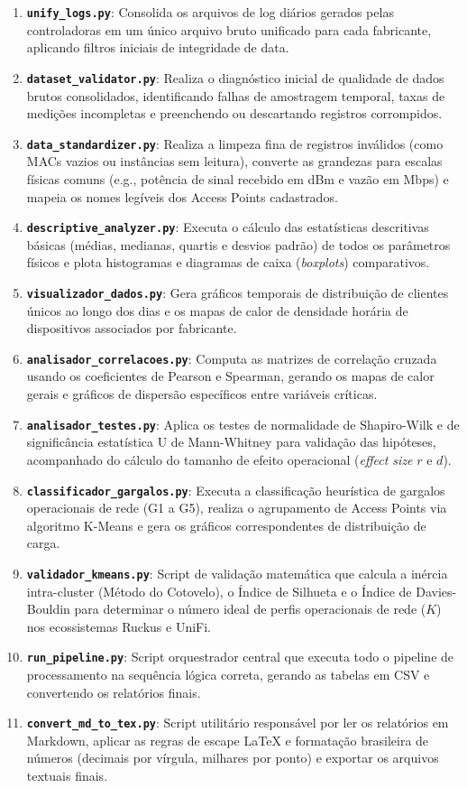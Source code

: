 \begin{enumerate}
    \item \textbf{\texttt{unify\_logs.py}}: Consolida os arquivos de log diários gerados pelas controladoras em um único arquivo bruto unificado para cada fabricante, aplicando filtros iniciais de integridade de data.
    \item \textbf{\texttt{dataset\_validator.py}}: Realiza o diagnóstico inicial de qualidade de dados brutos consolidados, identificando falhas de amostragem temporal, taxas de medições incompletas e preenchendo ou descartando registros corrompidos.
    \item \textbf{\texttt{data\_standardizer.py}}: Realiza a limpeza fina de registros inválidos (como MACs vazios ou instâncias sem leitura), converte as grandezas para escalas físicas comuns (e.g., potência de sinal recebido em dBm e vazão em Mbps) e mapeia os nomes legíveis dos Access Points cadastrados.
    \item \textbf{\texttt{descriptive\_analyzer.py}}: Executa o cálculo das estatísticas descritivas básicas (médias, medianas, quartis e desvios padrão) de todos os parâmetros físicos e plota histogramas e diagramas de caixa (\textit{boxplots}) comparativos.
    \item \textbf{\texttt{visualizador\_dados.py}}: Gera gráficos temporais de distribuição de clientes únicos ao longo dos dias e os mapas de calor de densidade horária de dispositivos associados por fabricante.
    \item \textbf{\texttt{analisador\_correlacoes.py}}: Computa as matrizes de correlação cruzada usando os coeficientes de Pearson e Spearman, gerando os mapas de calor gerais e gráficos de dispersão específicos entre variáveis críticas.
    \item \textbf{\texttt{analisador\_testes.py}}: Aplica os testes de normalidade de Shapiro-Wilk e de significância estatística U de Mann-Whitney para validação das hipóteses, acompanhado do cálculo do tamanho de efeito operacional (\textit{effect size} $r$ e $d$).
    \item \textbf{\texttt{classificador\_gargalos.py}}: Executa a classificação heurística de gargalos operacionais de rede (G1 a G5), realiza o agrupamento de Access Points via algoritmo K-Means e gera os gráficos correspondentes de distribuição de carga.
    \item \textbf{\texttt{validador\_kmeans.py}}: Script de validação matemática que calcula a inércia intra-cluster (Método do Cotovelo), o Índice de Silhueta e o Índice de Davies-Bouldin para determinar o número ideal de perfis operacionais de rede ($K$) nos ecossistemas Ruckus e UniFi.
    \item \textbf{\texttt{run\_pipeline.py}}: Script orquestrador central que executa todo o pipeline de processamento na sequência lógica correta, gerando as tabelas em CSV e convertendo os relatórios finais.
    \item \textbf{\texttt{convert\_md\_to\_tex.py}}: Script utilitário responsável por ler os relatórios em Markdown, aplicar as regras de escape LaTeX e formatação brasileira de números (decimais por vírgula, milhares por ponto) e exportar os arquivos textuais finais.
\end{enumerate}
